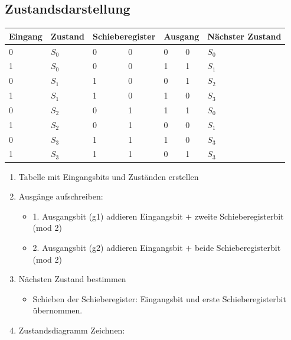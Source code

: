 \subsection{Zustandsdarstellung}
\begin{center}
    \begin{tabular}{p{0.7cm} | p{0.7cm}  p{.7cm} p{.4cm} | p{.3cm} p{.1cm} | p{1cm}}
        \hline
        Eingang & Zustand & \multicolumn{2}{p{.1cm}|}{Schieberegister} & \multicolumn{2}{p{.1cm}|}{Ausgang} & Nächster Zustand \\
        \hline
        \hline
        0   &   $S_0$   &   0   &   0   &   0   &   0   &   $S_0$\\
        1   &   $S_0$   &   0   &   0   &   1   &   1   &   $S_1$\\ \hline
        0   &   $S_1$   &   1   &   0   &   0   &   1   &   $S_2$\\
        1   &   $S_1$   &   1   &   0   &   1   &   0   &   $S_3$\\ \hline
        0   &   $S_2$   &   0   &   1   &   1   &   1   &   $S_0$\\
        1   &   $S_2$   &   0   &   1   &   0   &   0   &   $S_1$\\ \hline
        0   &   $S_3$   &   1   &   1   &   1   &   0   &   $S_3$\\
        1   &   $S_3$   &   1   &   1   &   0   &   1   &   $S_3$
    \end{tabular}
\end{center}
\begin{enumerate}
    \item Tabelle mit Eingangsbits und Zuständen erstellen
    \item Ausgänge aufschreiben:
    \begin{itemize}
        \item 1. Ausgangsbit (g1) addieren Eingangsbit $+$ zweite Schieberegisterbit (mod 2)
        \item 2. Ausgangsbit (g2) addieren Eingangsbit $+$ beide Schieberegisterbit (mod 2)
    \end{itemize}
    \item Nächsten Zustand bestimmen
    \begin{itemize}
        \item Schieben der Schieberegister: Eingangsbit und erste Schieberegisterbit übernommen.
    \end{itemize}
    \item Zustandsdiagramm Zeichnen:
\end{enumerate}
